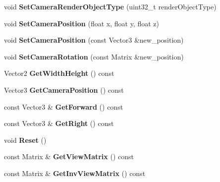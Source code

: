 \begin{DoxyCompactItemize}
\mbox{\label{classCamera_a084b1b5028ff915b0f30734c4fcb7ac7}} 
void {\bfseries Set\+Camera\+Render\+Object\+Type} (uint32\+\_\+t render\+Object\+Type)
\item 
\mbox{\label{classCamera_a83ffec8a5dfac0fa1ca1ea6388035dca}} 
void {\bfseries Set\+Camera\+Position} (float x, float y, float z)
\item 
\mbox{\label{classCamera_a3a2df84800e210c35c8282b0f1022dac}} 
void {\bfseries Set\+Camera\+Position} (const Vector3 \&new\+\_\+position)
\item 
\mbox{\label{classCamera_a148acfe88ccb73ba5b658cd2e19ee244}} 
void {\bfseries Set\+Camera\+Rotation} (const Matrix \&new\+\_\+position)
\item 
\mbox{\label{classCamera_a601c02931f32a0909bba512fb26a7b0c}} 
Vector2 {\bfseries Get\+Width\+Height} () const
\item 
\mbox{\label{classCamera_a9378bf4ae942a64e0bbda67a79e57922}} 
Vector3 {\bfseries Get\+Camera\+Position} () const
\item 
\mbox{\label{classCamera_a2b34df2f0303bac1ed652bc3186e5a98}} 
const Vector3 \& {\bfseries Get\+Forward} () const
\item 
\mbox{\label{classCamera_afd3c91fa693b8a6fb74d2e4708f3aae2}} 
const Vector3 \& {\bfseries Get\+Right} () const
\item 
\mbox{\label{classCamera_aa46f58b32270a571ab56dde4caca46db}} 
void {\bfseries Reset} ()
\item 
\mbox{\label{classCamera_ae56a0f8c9aa2d4eead91fe342159b1e5}} 
const Matrix \& {\bfseries Get\+View\+Matrix} () const
\item 
\mbox{\label{classCamera_a7af480f3ec57bf981cd00b202aa0ff13}} 
const Matrix \& {\bfseries Get\+Inv\+View\+Matrix} () const
\item 
\mbox{\label{classCamera_a51e9a67637aeb424e1e173eae22d23c1}} 

\end{DoxyCompactItemize}
